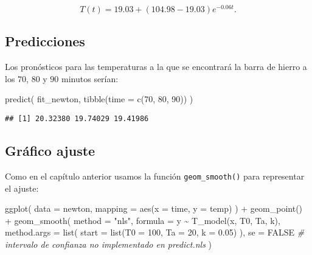 \documentclass[
  degree=mecinf,
  title=normal,
  toc=normal,
  bib=normal]{mnye}
\newenvironment{Shaded}{\begin{snugshade}}{\end{snugshade}}
\newcommand{\AttributeTok}[1]{\textcolor[rgb]{0.77,0.63,0.00}{#1}}
\newcommand{\CommentTok}[1]{\textcolor[rgb]{0.56,0.35,0.01}{\textit{#1}}}
\newcommand{\ConstantTok}[1]{\textcolor[rgb]{0.00,0.00,0.00}{#1}}
\newcommand{\DecValTok}[1]{\textcolor[rgb]{0.00,0.00,0.81}{#1}}
\newcommand{\FloatTok}[1]{\textcolor[rgb]{0.00,0.00,0.81}{#1}}
\newcommand{\FunctionTok}[1]{\textcolor[rgb]{0.00,0.00,0.00}{#1}}
\newcommand{\NormalTok}[1]{#1}
\newcommand{\SpecialCharTok}[1]{\textcolor[rgb]{0.00,0.00,0.00}{#1}}
\newcommand{\StringTok}[1]{\textcolor[rgb]{0.31,0.60,0.02}{#1}}
\begin{document}
\[T(t) = 19.03 + (104.98-19.03)e^{-0.06t}.\]

\hypertarget{predicciones-1}{%
\subsection{Predicciones}\label{predicciones-1}}

Los pronósticos para las temperaturas a la que se encontrará la barra de hierro a los \(70\), \(80\) y \(90\) minutos serían:

\begin{Shaded}
\begin{Highlighting}[]
\FunctionTok{predict}\NormalTok{(}
\NormalTok{    fit\_newton,}
    \FunctionTok{tibble}\NormalTok{(}\AttributeTok{time =} \FunctionTok{c}\NormalTok{(}\DecValTok{70}\NormalTok{, }\DecValTok{80}\NormalTok{, }\DecValTok{90}\NormalTok{))}
\NormalTok{)}
\end{Highlighting}
\end{Shaded}

\begin{verbatim}
## [1] 20.32380 19.74029 19.41986
\end{verbatim}

\hypertarget{gruxe1fico-ajuste}{%
\subsection{Gráfico ajuste}\label{gruxe1fico-ajuste}}

Como en el capítulo anterior usamos la función \texttt{geom\_smooth()} para representar el ajuste:

\begin{Shaded}
\begin{Highlighting}[]
\FunctionTok{ggplot}\NormalTok{(}
    \AttributeTok{data =}\NormalTok{ newton, }
    \AttributeTok{mapping =} \FunctionTok{aes}\NormalTok{(}\AttributeTok{x =}\NormalTok{ time, }\AttributeTok{y =}\NormalTok{ temp)}
\NormalTok{) }\SpecialCharTok{+} 
    \FunctionTok{geom\_point}\NormalTok{() }\SpecialCharTok{+} 
    \FunctionTok{geom\_smooth}\NormalTok{(}
        \AttributeTok{method =} \StringTok{"nls"}\NormalTok{,}
        \AttributeTok{formula =}\NormalTok{ y }\SpecialCharTok{\textasciitilde{}} \FunctionTok{T\_model}\NormalTok{(x, T0, Ta, k),}
        \AttributeTok{method.args =} \FunctionTok{list}\NormalTok{(}
            \AttributeTok{start =} \FunctionTok{list}\NormalTok{(}\AttributeTok{T0 =} \DecValTok{100}\NormalTok{, }\AttributeTok{Ta =} \DecValTok{20}\NormalTok{, }\AttributeTok{k =} \FloatTok{0.05}\NormalTok{)}
\NormalTok{        ),}
        \AttributeTok{se =} \ConstantTok{FALSE} \CommentTok{\# intervalo de confianza no implementado en predict.nls}
\NormalTok{    )}
\end{Highlighting}
\end{Shaded}
\end{document}
